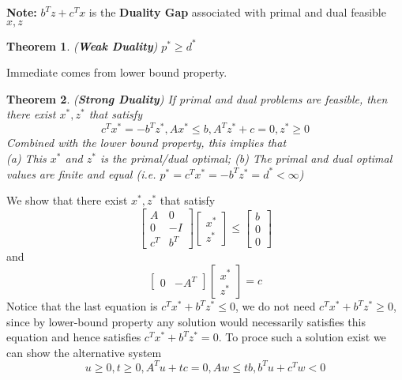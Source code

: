 \documentclass[10pt]{article}
\newtheorem{thm}{Theorem}[section]
\theoremstyle{definition}
\newcommand{\Note}[0]{\noindent\textbf{Note: }}
\begin{document}
\Note $b^Tz + c^Tx$ is the \textbf{Duality Gap} associated with primal and dual feasible $x, z$

\begin{thm} (\textbf{Weak Duality})
	$p^* \ge d^*$
\end{thm}
\proof Immediate comes from lower bound property. \qedhere

\begin{thm} (\textbf{Strong Duality})
	If primal and dual problems are feasible, then there exist $x^*, z^*$ that satisfy
	\begin{equation*}
		c^Tx^* = -b^Tz^*, Ax^* \le b, A^Tz^* + c = 0, z^* \ge 0
	\end{equation*}
	Combined with the lower bound property, this implies that\\
	(a) This $x^*$ and $z^*$ is the primal/dual optimal; (b) The primal and dual optimal values are finite and equal 
	(i.e. $p^* = c^Tx^* = -b^Tz^* = d^* < \infty$)
\end{thm}
\proof We show that there exist $x^*, z^*$ that satisfy 
\begin{equation*}
	\begin{bmatrix}
		A & 0 \\ 0 & -I \\ c^T & b^T
	\end{bmatrix}
	\begin{bmatrix}
		x^* \\ z^*
	\end{bmatrix} \le
	\begin{bmatrix}
		b \\ 0 \\ 0
	\end{bmatrix}
\end{equation*} and 
\begin{equation*}
	\begin{bmatrix}
		0 & -A^T
	\end{bmatrix}
	\begin{bmatrix}
		x^* \\ z^*
	\end{bmatrix} = c
\end{equation*}
Notice that the last equation is $c^Tx^* + b^Tz^* \le 0$, we do not need $c^Tx^* + b^Tz^* \ge 0$, 
since by lower-bound property any solution would necessarily satisfies this equation and 
hence satisfies $c^Tx^* + b^Tz^* = 0$. To proce such a solution exist we can show the alternative system
\begin{equation*}
	u \ge 0, t \ge 0, A^Tu + tc = 0, Aw \le tb, b^Tu + c^Tw < 0
\end{equation*}
\end{document}
